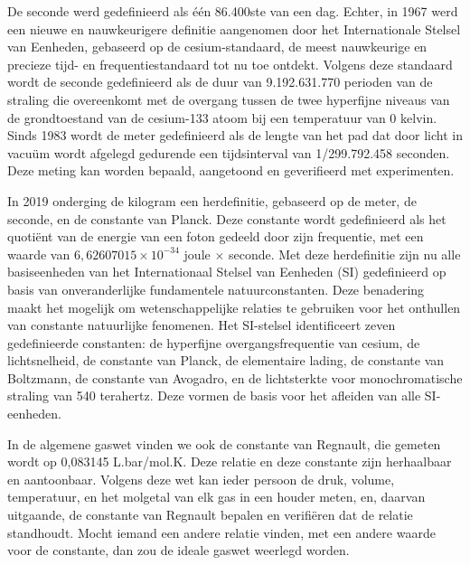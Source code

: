 De seconde werd gedefinieerd als één 86.400ste van een dag. Echter, in 1967 werd een nieuwe en nauwkeurigere definitie aangenomen door het Internationale Stelsel van Eenheden, gebaseerd op de cesium-standaard, de meest nauwkeurige en precieze tijd- en frequentiestandaard tot nu toe ontdekt. Volgens deze standaard wordt de seconde gedefinieerd als de duur van 9.192.631.770 perioden van de straling die overeenkomt met de overgang tussen de twee hyperfijne niveaus van de grondtoestand van de cesium-133 atoom bij een temperatuur van 0 kelvin. Sinds 1983 wordt de meter gedefinieerd als de lengte van het pad dat door licht in vacuüm wordt afgelegd gedurende een tijdsinterval van 1/299.792.458 seconden. Deze meting kan worden bepaald, aangetoond en geverifieerd met experimenten.

In 2019 onderging de kilogram een herdefinitie, gebaseerd op de meter, de seconde, en de constante van Planck. Deze constante wordt gedefinieerd als het quotiënt van de energie van een foton gedeeld door zijn frequentie, met een waarde van \(6,62607015 \times 10^{-34}\) joule \( \times \) seconde. Met deze herdefinitie zijn nu alle basiseenheden van het Internationaal Stelsel van Eenheden (SI) gedefinieerd op basis van onveranderlijke fundamentele natuurconstanten. Deze benadering maakt het mogelijk om wetenschappelijke relaties te gebruiken voor het onthullen van constante natuurlijke fenomenen. Het SI-stelsel identificeert zeven gedefinieerde constanten: de hyperfijne overgangsfrequentie van cesium, de lichtsnelheid, de constante van Planck, de elementaire lading, de constante van Boltzmann, de constante van Avogadro, en de lichtsterkte voor monochromatische straling van 540 terahertz. Deze vormen de basis voor het afleiden van alle SI-eenheden.

In de algemene gaswet vinden we ook de constante van Regnault, die gemeten wordt op 0,083145 L.bar/mol.K. Deze relatie en deze constante zijn herhaalbaar en aantoonbaar. Volgens deze wet kan ieder persoon de druk, volume, temperatuur, en het molgetal van elk gas in een houder meten, en, daarvan uitgaande, de constante van Regnault bepalen en verifiëren dat de relatie standhoudt. Mocht iemand een andere relatie vinden, met een andere waarde voor de constante, dan zou de ideale gaswet weerlegd worden.

